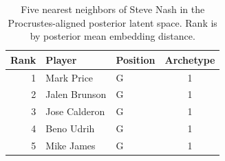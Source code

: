 \begin{table}[htbp]
  \centering\small
  \begin{tabular}{rllc}
    \toprule
    Rank & Player & Position & Archetype \\
    \midrule
    1 & Mark Price & G & 1 \\
    2 & Jalen Brunson & G & 1 \\
    3 & Jose Calderon & G & 1 \\
    4 & Beno Udrih & G & 1 \\
    5 & Mike James & G & 1 \\
    \bottomrule
  \end{tabular}
  \caption{Five nearest neighbors of Steve Nash in the Procrustes-aligned posterior latent space. Rank is by posterior mean embedding distance.}
  \label{tab:Steve_Nash_neighbors}
\end{table}

